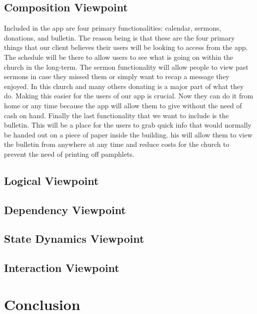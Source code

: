\documentclass[letterpaper,10pt,draftclsnofoot,onecolumn,titlepage]{IEEEtran}
\begin{document}
	
		
		\subsection{Composition Viewpoint}
		Included in the app are four primary functionalities: calendar, sermons, donations, and bulletin. 
		The reason being is that these are the four primary things that our client believes their users will be looking to access from the app. 
		The schedule will be there to allow users to see what is going on within the church in the long-term. 
		The sermon functionality will allow people to view past sermons in case they missed them or simply want to recap a message they enjoyed. 
		In this church and many others donating is a major part of what they do. 
		Making this easier for the users of our app is crucial. 
		Now they can do it from home or any time because the app will allow them to give without the need of cash on hand. 
		Finally the last functionality that we want to include is the bulletin. 
		This will be a place for the users to grab quick info that would normally be handed out on a piece of paper inside the building. 
		his will allow them to view the bulletin from anywhere at any time and reduce costs for the church to prevent the need of printing off pamphlets. 
		\subsection{Logical Viewpoint}
		
		\subsection{Dependency Viewpoint}
		
		\subsection{State Dynamics Viewpoint}
		
		\subsection{Interaction Viewpoint}
		
	\section{Conclusion}
	
	
\end{document}
